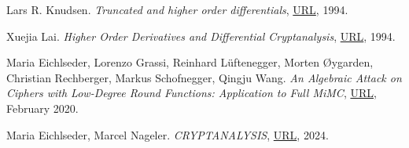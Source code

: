\documentclass{Resources/UoBLab1}
\theoremstyle{definition}
\begin{document}
\begin{thebibliography}{10}
 Lars R. Knudsen. \textit{Truncated and higher order differentials}, \href{https://link.springer.com/chapter/10.1007/3-540-60590-8_16}{URL}, 1994.

 Xuejia Lai. \textit{Higher Order Derivatives and Differential Cryptanalysis}, \href{https://link.springer.com/chapter/10.1007/978-1-4615-2694-0_23}{URL}, 1994.

 Maria Eichlseder, Lorenzo Grassi, Reinhard Lüftenegger, Morten Øygarden, Christian Rechberger, Markus Schofnegger, Qingju Wang. \textit{An Algebraic Attack on Ciphers with Low-Degree Round Functions: Application to Full MiMC}, \href{https://eprint.iacr.org/2020/182.pdf}{URL}, February 2020.

 Maria Eichlseder, Marcel Nageler. \textit{CRYPTANALYSIS}, \href{https://www.iaik.tugraz.at/course/cryptanalysis-705068-sommersemester-2024}{URL}, 2024.

\end{thebibliography}
\end{document}
